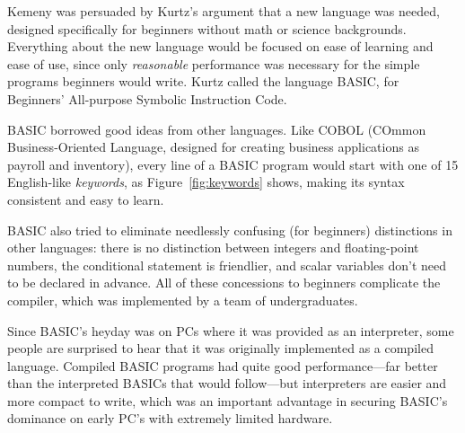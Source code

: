 Kemeny was persuaded by Kurtz's argument that a new language was needed,
designed specifically for beginners without math or science backgrounds.
Everything about the new language would be focused on ease of learning
and ease of use, since only \emph{reasonable} performance was necessary
for the simple programs beginners would write.
Kurtz called the language BASIC, for Beginners' All-purpose Symbolic
Instruction Code.

BASIC borrowed good ideas from other languages.
Like COBOL (COmmon Business-Oriented Language, designed for creating
business applications as payroll and inventory), every line of a BASIC
program would start with one of 15 English-like \emph{keywords}, as Figure~\ref{fig:keywords} shows,
making its syntax consistent and easy
to learn.


BASIC also tried to eliminate needlessly confusing (for beginners)
distinctions in other languages: there is no distinction between
integers and floating-point numbers, the conditional statement is
friendlier, and scalar variables don't need to be declared in advance.
All of these concessions to beginners complicate the compiler, which was
implemented by a team of undergraduates.

\begin{tangent}
  Since BASIC's heyday was on PCs where it was provided as an
  interpreter, some people are surprised to hear that it was originally
  implemented as a compiled language.  Compiled BASIC programs had quite
  good performance---far better than the interpreted BASICs that would
  follow---but interpreters are easier and more compact to write, which
  was an important advantage in securing BASIC's dominance on
  early PC's with extremely limited hardware.
\end{tangent}

